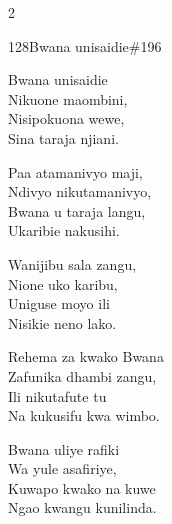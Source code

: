 \begin{multicols}{2}
\begin{hymn}{128}{Bwana unisaidie}{\#196}
\begin{stanza}
Bwana unisaidie\\
Nikuone maombini,\\
Nisipokuona wewe,\\
Sina taraja njiani.
\end{stanza}
\begin{chorus}
Paa atamanivyo maji,\\
Ndivyo nikutamanivyo,\\
Bwana u taraja langu,\\
Ukaribie nakusihi.
\end{chorus}
\begin{stanza}
Wanijibu sala zangu,\\
Nione uko karibu,\\
Uniguse moyo ili\\
Nisikie neno lako.
\end{stanza}
\begin{stanza}
Rehema za kwako Bwana\\
Zafunika dhambi zangu,\\
Ili nikutafute tu\\
Na kukusifu kwa wimbo.
\end{stanza}
\begin{stanza}
Bwana uliye rafiki\\
Wa yule asafiriye,\\
Kuwapo kwako na kuwe\\
Ngao kwangu kunilinda.
\end{stanza}
\end{hymn}


\end{multicols}

